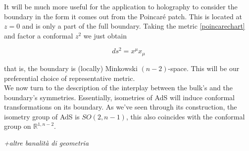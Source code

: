 \documentclass[11pt,a4paper,oneside,openright,titlepage]{book}
\newcommand{\cmmnt}[1]{\textcolor{Mahogany}{\emph{#1}}}
\begin{document}
It will be much more useful for the application to holography to consider the boundary in the form it comes out from the Poincaré patch. This is located at $z=0$ and is only a part of the full boundary. Taking the metric \ref{poincarechart} and factor a conformal $z^2$ we just obtain

\begin{equation}
	ds^2 = x^\mu x_\mu
\end{equation}

that is, the boundary is (locally) Minkowski $(n-2)$-space. This will be our preferential choice of representative metric.\\

We now turn to the description of the interplay between the bulk's and the boundary's symmetries. Essentially, isometries of AdS will induce conformal transformations on its boundary. As we've seen through its construction, the isometry group of AdS is $SO(2,n-1)$, this also coincides with the conformal group on $\mathbb{R}^{1,n-2}$.

\cmmnt{+altre banalità di geometria}

\backmatter



\end{document}
